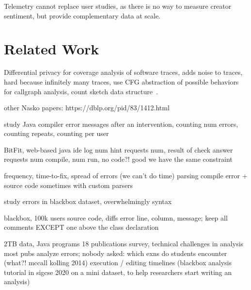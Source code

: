 \documentclass[english,submission,cleveref]{programming}
\begin{document}
Telemetry cannot replace user studies, as there is no way to measure
creator sentiment, but provide complementary data at scale.


\section{Related Work}
\label{s:related}

Differential privacy for coverage analysis of software traces,
adds noise to traces,
hard because infinitely many traces,
use CFG abstraction of possible behaviors for callgraph analysis,
count sketch data structure~\cite{hlzbr-ecoop-2021}.

other Nasko papers:
https://dblp.org/pid/83/1412.html


\cite{bgimgm-cse-2016}
study Java compiler error messages after an intervention, counting num errors,
counting repeats, counting per user

\cite{anna-russo-kennedy-ms-2006}
BitFit, web-based java ide log num hint requests num, result of check answer
requests num compile, num run, no code?! good we have the same constraint

\cite{ab-sigcse-2015}
frequency, time-to-fix, spread of errors
 (we can't do time)
parsing compile error + source code
 sometimes with custom parsers

\cite{m-masters-2016}
study errors in blackbox dataset,
 overwhelmingly syntax

\cite{bkmu-sigcse-2014}
blackbox, 100k users
source code, diffs
error line, column, message;
keep all comments EXCEPT one above the class declaration


\cite{bask-icer-2018}
2TB data, Java programs
18 publications survey, technical challenges in analysis
 most pubs analyze errors;
nobody asked:
 which exns do students encounter (what?! mccall kolling 2014)
 execution / editing timelines
(blackbox analysis tutorial in sigcse 2020 on a mini dataset, to help researchers start writing an analysis)
\end{document}
